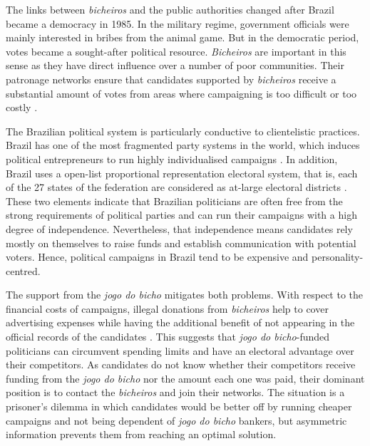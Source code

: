 The links between \emph{bicheiros} and the public authorities changed after Brazil became a democracy in 1985. In the military regime, government officials were mainly interested in bribes from the animal game. But in the democratic period, votes became a sought-after political resource. \emph{Bicheiros} are important in this sense as they have direct influence over a number of poor communities. Their patronage networks ensure that candidates supported by \emph{bicheiros} receive a substantial amount of votes from areas where campaigning is too difficult or too costly \citep[17]{misse2011crime}.

The Brazilian political system is particularly conductive to clientelistic practices. Brazil has one of the most fragmented party systems in the world, which induces political entrepreneurs to run highly individualised campaigns \citep{figueiredo2000presidential,geddes1992institutional}. In addition, Brazil uses a open-list proportional representation electoral system, that is, each of the 27 states of the federation are considered as at-large electoral districts \citetext{\citealp{ames1995electoral}; \citealp{mainwaring1992brazilian}; \citealp[483]{samuels2000ambition}}. These two elements indicate that Brazilian politicians are often free from the strong requirements of political parties and can run their campaigns with a high degree of independence. Nevertheless, that independence means candidates rely mostly on themselves to raise funds and establish communication with potential voters. Hence, political campaigns in Brazil tend to be expensive and personality-centred.

The support from the \emph{jogo do bicho} mitigates both problems. With respect to the financial costs of campaigns, illegal donations from \emph{bicheiros} help to cover advertising expenses while having the additional benefit of not appearing in the official records of the candidates \citep{congressoemfoco2007bicho,gazetadopovo2007bicho,globo2012bicheiro}. This suggests that \emph{jogo do bicho}-funded politicians can circumvent spending limits and have an electoral advantage over their competitors. As candidates do not know whether their competitors receive funding from the \emph{jogo do bicho} nor the amount each one was paid, their dominant position is to contact the \emph{bicheiros} and join their networks. The situation is a prisoner's dilemma in which candidates would be better off by running cheaper campaigns and not being dependent of \emph{jogo do bicho} bankers, but asymmetric information prevents them from reaching an optimal solution.

